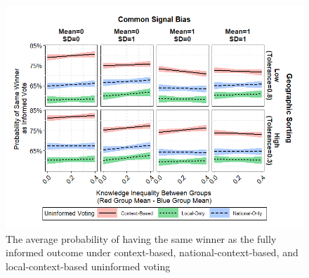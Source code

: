 \begin{figure}[ht!!!]
    \caption{The average probability of having the same winner as the fully informed outcome under context-based, national-context-based, and local-context-based uninformed voting}
    \label{fig:abmres2c}
    \includegraphics[width=\linewidth]{../outputs/abmres2c.png}
\end{figure}


